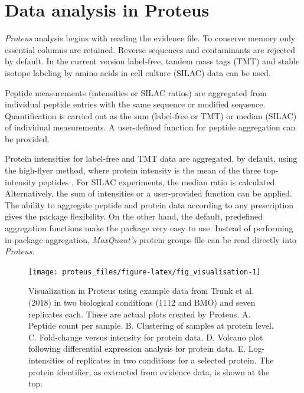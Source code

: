 \documentclass[]{article}
\begin{document}
\section{Data analysis in Proteus}\label{data-analysis-in-proteus}

\emph{Proteus} analysis begins with reading the evidence file. To
conserve memory only essential columns are retained. Reverse sequences
and contaminants are rejected by default. In the current version
label-free, tandem mass tags (TMT) \citep{thompson2003} and stable
isotope labeling by amino acids in cell culture (SILAC) \citep{ong2002}
data can be used.

Peptide measurements (intensities or SILAC ratios) are aggregated from
individual peptide entries with the same sequence or modified sequence.
Quantification is carried out as the sum (label-free or TMT) or median
(SILAC) of individual measurements. A user-defined function for peptide
aggregation can be provided.

Protein intensities for label-free and TMT data are aggregated, by
default, using the high-flyer method, where protein intensity is the
mean of the three top-intensity peptides \citep{silva2006}. For SILAC
experiments, the median ratio is calculated. Alternatively, the sum of
intensities or a user-provided function can be applied. The ability to
aggregate peptide and protein data according to any prescription gives
the package flexibility. On the other hand, the default, predefined
aggregation functions make the package very easy to use. Instead of
performing in-package aggregation, \emph{MaxQuant's} protein groups file
can be read directly into \emph{Proteus}.

\begin{figure}[H]

{\centering \texttt{[image: proteus\_files/figure-latex/fig\_visualisation-1]} 

}

\caption{\label{fig:visualisation}Visualization in Proteus using example data from Trunk et al. (2018) in two biological conditions (1112 and BMO) and seven replicates each. These are actual plots created by Proteus. A. Peptide count per sample. B. Clustering of samples at protein level. C. Fold-change versus intensity for protein data. D. Volcano plot following differential expression analysis for protein data. E. Log-intensities of replicates in two conditions for a selected protein. The protein identifier, as extracted from evidence data, is shown at the top.}\label{fig:fig_visualisation}
\end{figure}
\end{document}
